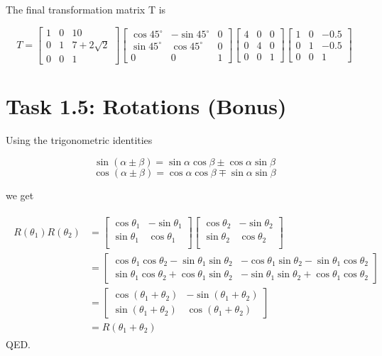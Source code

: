 \documentclass[paper=a4, fontsize=11pt]{scrartcl} %
\numberwithin{equation}{section} %
\numberwithin{figure}{section} %
\numberwithin{table}{section} %
\begin{document}
The final transformation matrix T is

\[
  T=
  \begin{bmatrix}
    1 & 0 & 10\\
    0 & 1 & 7 + 2\sqrt{2}\\
    0 & 0 & 1
  \end{bmatrix}
  \begin{bmatrix}
    \cos{45^\circ} & -\sin{45^\circ} & 0\\
    \sin{45^\circ} & \cos{45^\circ} & 0\\
    0 & 0 & 1
  \end{bmatrix}
  \begin{bmatrix}
    4 & 0 & 0\\
    0 & 4 & 0\\
    0 & 0 & 1
  \end{bmatrix}
  \begin{bmatrix}
    1 & 0 & -0.5\\
    0 & 1 & -0.5\\
    0 & 0 & 1
  \end{bmatrix}
\]

\section*{Task 1.5: Rotations (Bonus)}

Using the trigonometric identities

\[
  \sin(\alpha \pm \beta )=\sin \alpha \cos \beta \pm \cos \alpha \sin \beta
\]
\[
  \cos(\alpha \pm \beta )=\cos \alpha \cos \beta \mp \sin \alpha \sin \beta
\]

we get

\begin{align*} 
\begin{split}
  R(\theta_1)R(\theta_2) &=
  \begin{bmatrix}
    \cos{\theta_1} & -\sin{\theta_1}\\
    \sin{\theta_1} & \cos{\theta_1}\\
  \end{bmatrix}
  \begin{bmatrix}
    \cos{\theta_2} & -\sin{\theta_2}\\
    \sin{\theta_2} & \cos{\theta_2}\\
  \end{bmatrix}\\
  &=
  \begin{bmatrix}
    \cos\theta_1\cos\theta_2 - \sin\theta_1\sin\theta_2 & -\cos\theta_1\sin\theta_2 - \sin\theta_1\cos\theta_2\\
    \sin\theta_1\cos\theta_2 + \cos\theta_1\sin\theta_2 & -\sin\theta_1\sin\theta_2 + \cos\theta_1\cos\theta_2
  \end{bmatrix}\\
  &=
  \begin{bmatrix}
    \cos{(\theta_1 + \theta_2)} & -\sin{(\theta_1 + \theta_2)}\\
    \sin{(\theta_1 + \theta_2)} & \cos{(\theta_1 + \theta_2)}
  \end{bmatrix}\\
  &= 
  R(\theta_1 + \theta_2)
\end{split}
\end{align*} 
QED.
\end{document}
